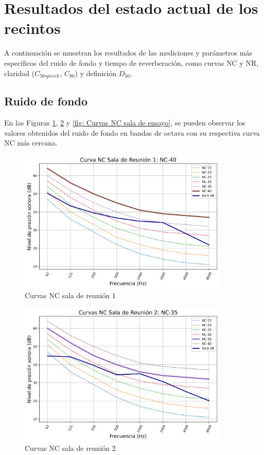 \section{Resultados del estado actual de los recintos}
A continuación se muestran los resultados de las mediciones y parámetros más específicos del ruido de fondo y tiempo de reverberación, como curvas NC y NR, claridad ($C_{50speech}$, $C_{80}$) y definición $D_{50}$.
\subsection{Ruido de fondo}
En las Figuras \ref{fig: Curvas NC sala 1}, \ref{fig: Curvas NC sala 2} y \ref{fig: Curvas NC sala de ensayo}, se pueden observar los valores obtenidos del ruido de fondo en bandas de octava con su respectiva curva NC más cercana.
    \begin{figure}[H]
        \centering
        \includegraphics[width=10cm]{Imagenes/Resultados/Curvas NC-NR/NC reunion 1.png}
        \caption{Curvas NC sala de reunión 1}
        \label{fig: Curvas NC sala 1}
    \end{figure}

    \begin{figure}[H]
        \centering
        \includegraphics[width=10cm]{Imagenes/Resultados/Curvas NC-NR/NC reunion 2.png}
        \caption{Curvas NC sala de reunión 2}
        \label{fig: Curvas NC sala 2}
    \end{figure}

